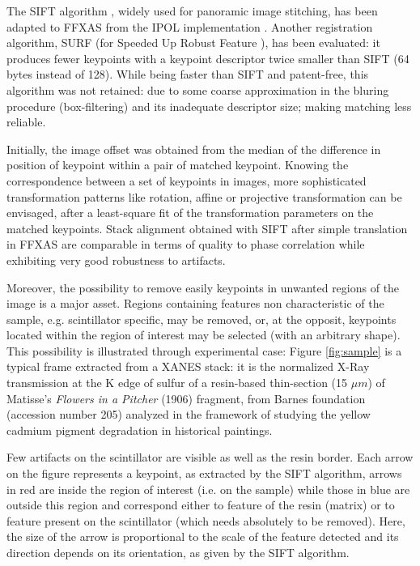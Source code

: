 \documentclass[preprint]{iucr}
\begin{document}
The SIFT algorithm \cite{Lowe99,Lowe04}, widely used for panoramic image
stitching, has been adapted to FFXAS from the IPOL implementation \cite{ASIFT}.
Another registration algorithm, SURF (for Speeded Up Robust Feature
\cite{surf}), has been evaluated: it produces fewer keypoints with a keypoint
descriptor twice smaller than SIFT (64 bytes instead of 128).
While being faster than SIFT and patent-free, this algorithm was not
retained:  due to some coarse approximation in the bluring procedure
(box-filtering) and its inadequate descriptor size; making matching less
reliable.

Initially, the image offset was obtained from the median of the
difference in position of keypoint within a pair of matched keypoint.
Knowing the correspondence between a set of keypoints in images,
more sophisticated transformation patterns like rotation, affine
or projective transformation can be envisaged, after a least-square fit of the
transformation parameters on the matched keypoints.
Stack alignment obtained with SIFT after simple translation in FFXAS are
comparable in terms of quality to phase correlation while exhibiting very good
robustness to artifacts.

Moreover, the possibility to remove easily keypoints in unwanted regions of 
the image is a major asset. 
Regions containing features non characteristic of the sample, e.g. scintillator 
specific, may be removed, or, at the opposit, keypoints located within the 
region of interest may be selected (with an arbitrary shape).
This possibility is illustrated through experimental case: Figure
\ref{fig:sample}
is a typical frame extracted from a XANES stack:
it is the normalized X-Ray transmission at the K edge of sulfur 
of a resin-based thin-section 
(15 $\mu m$) of Matisse’s \emph{Flowers in a Pitcher} (1906) fragment, from
Barnes foundation (accession number 205) analyzed in the framework of studying the
yellow cadmium pigment degradation in historical paintings.

Few artifacts on the scintillator are visible as well as the resin border.
Each arrow on the figure represents a keypoint, as extracted by the SIFT
algorithm, arrows in red are inside the region of interest (i.e. on the sample)
while those in blue are outside this region and
correspond either to feature of the resin (matrix) or to feature present on the
scintillator (which needs absolutely to be removed).
Here, the size of the arrow is proportional to the scale of the feature
detected and its direction depends on its orientation, as given by the SIFT algorithm.
\end{document}
